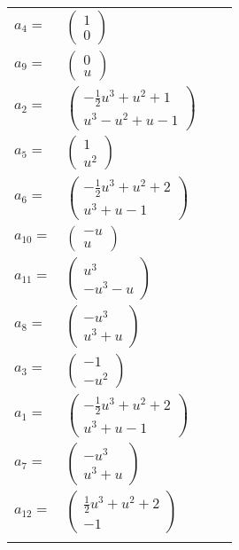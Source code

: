\documentclass[1p]{elsarticle_modified}
\theoremstyle{definition}
\begin{document}
\begin{tabular}{m{7pt} m{180pt} m{7pt} m{180pt} }
\flushright $a_{4}=$&$\begin{pmatrix}1\\0\end{pmatrix}$ \\
\flushright $a_{9}=$&$\begin{pmatrix}0\\u\end{pmatrix}$ \\
\flushright $a_{2}=$&$\begin{pmatrix}-\frac{1}{2} u^3+u^2+1\\u^3- u^2+u-1\end{pmatrix}$ \\
\flushright $a_{5}=$&$\begin{pmatrix}1\\u^2\end{pmatrix}$ \\
\flushright $a_{6}=$&$\begin{pmatrix}-\frac{1}{2} u^3+u^2+2\\u^3+u-1\end{pmatrix}$ \\
\flushright $a_{10}=$&$\begin{pmatrix}- u\\u\end{pmatrix}$ \\
\flushright $a_{11}=$&$\begin{pmatrix}u^3\\- u^3- u\end{pmatrix}$ \\
\flushright $a_{8}=$&$\begin{pmatrix}- u^3\\u^3+u\end{pmatrix}$ \\
\flushright $a_{3}=$&$\begin{pmatrix}-1\\- u^2\end{pmatrix}$ \\
\flushright $a_{1}=$&$\begin{pmatrix}-\frac{1}{2} u^3+u^2+2\\u^3+u-1\end{pmatrix}$ \\
\flushright $a_{7}=$&$\begin{pmatrix}- u^3\\u^3+u\end{pmatrix}$ \\
\flushright $a_{12}=$&$\begin{pmatrix}\frac{1}{2} u^3+u^2+2\\-1\end{pmatrix}$\\&\end{tabular}
\end{document}
